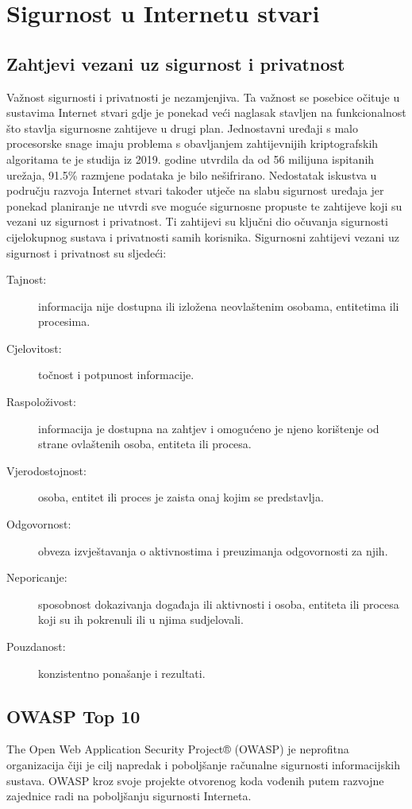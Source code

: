 \documentclass[times, utf8, diplomski]{fer}
\begin{document}
\chapter{Sigurnost u Internetu stvari}
\section{Zahtjevi vezani uz sigurnost i privatnost}
Važnost sigurnosti i privatnosti je nezamjenjiva. Ta važnost se posebice očituje u sustavima Internet stvari gdje je ponekad veći naglasak stavljen na funkcionalnost što stavlja sigurnosne zahtijeve u drugi plan. Jednostavni uređaji s malo procesorske snage imaju problema s obavljanjem zahtijevnijih kriptografskih algoritama te je studija iz 2019. godine utvrdila da od 56 milijuna ispitanih urežaja, 91.5\% razmjene podataka je bilo nešifrirano\citep{Greene2019May}. Nedostatak iskustva u području razvoja Internet stvari također utječe na slabu sigurnost uređaja jer ponekad planiranje ne utvrdi sve moguće sigurnosne propuste te zahtijeve koji su vezani uz sigurnost i privatnost. Ti zahtijevi su ključni dio očuvanja sigurnosti cijelokupnog sustava i privatnosti samih korisnika. Sigurnosni zahtijevi vezani uz sigurnost i privatnost su sljedeći\citep{InternetStvari}:

\begin{description}
    \item[Tajnost:]informacija nije dostupna ili izložena  neovlaštenim osobama, entitetima ili procesima.
    \item[Cjelovitost:]točnost i potpunost informacije.
    \item[Raspoloživost:]informacija je dostupna na zahtjev i omogućeno je njeno korištenje od strane ovlaštenih osoba, entiteta ili procesa.
    \item[Vjerodostojnost:]osoba, entitet ili proces je zaista onaj kojim se predstavlja.
    \item[Odgovornost:]obveza izvještavanja o aktivnostima i preuzimanja odgovornosti za njih.
    \item[Neporicanje:]sposobnost dokazivanja događaja ili aktivnosti i osoba, entiteta ili procesa koji su ih pokrenuli ili u njima sudjelovali.
    \item[Pouzdanost:]konzistentno ponašanje i rezultati.
\end{description}

\section{OWASP Top 10}
The Open Web Application Security Project® (OWASP) je neprofitna organizacija čiji je cilj napredak i poboljšanje računalne sigurnosti informacijskih sustava. OWASP kroz svoje projekte otvorenog koda vođenih putem razvojne zajednice radi na poboljšanju sigurnosti Interneta.
\end{document}

